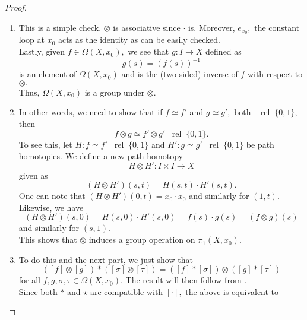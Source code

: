 \documentclass[12pt]{article}
\newcommand{\rel}{\;\;\operatorname{rel}\;}
\begin{document}
\begin{proof} 
	\phantom{Hi}
	\begin{enumerate}
		\item This is a simple check. $\otimes$ is associative since $\cdot$ is. Moreover, $e_{x_0},$ the constant loop at $x_0$ acts as the identity as can be easily checked.\\
		Lastly, given $f\in\Omega(X, x_0),$ we see that $g:I\to X$ defined as
		\begin{equation*} 
			g(s) = (f(s))^{-1}
		\end{equation*}
		is an element of $\Omega(X, x_0)$ and is the (two-sided) inverse of $f$ with respect to $\otimes.$\\
		Thus, $\Omega(X, x_0)$ is a group under $\otimes.$
		\item In other words, we need to show that if $f \simeq f'$ and $g \simeq g',$ both $\rel \{0, 1\},$ then
		\begin{equation*} 
			f\otimes g \simeq f'\otimes g' \rel\{0, 1\}.
		\end{equation*}
		To see this, let $H:f\simeq f' \rel\{0, 1\}$ and $H':g\simeq g'\rel\{0, 1\}$ be path homotopies. We define a new path homotopy 
		\begin{equation*} 
			H\otimes H': I \times I \to X
		\end{equation*} given as
		\begin{equation*} 
			(H \otimes H')(s, t) = H(s, t)\cdot H'(s, t).
		\end{equation*}
		One can note that $(H\otimes H')(0, t) = x_0\cdot x_0$ and similarly for $(1, t).$\\
		Likewise, we have 
		\begin{equation*} 
			(H \otimes H')(s, 0) = H(s, 0)\cdot H'(s, 0) = f(s)\cdot g(s) = (f\otimes g)(s)
		\end{equation*}
		and similarly for $(s, 1).$\\
		This shows that $\otimes$ induces a group operation on $\pi_1(X, x_0).$ 
		\item To do this and the next part, we just show that
		\begin{equation*} 
			([f] \otimes [g]) * ([\sigma] \otimes [\tau]) = ([f] * [\sigma]) \otimes ([g] * [\tau])
		\end{equation*}
		for all $f, g, \sigma, \tau \in \Omega(X, x_0).$ The result will then follow from .\\
		Since both $*$ and $\star$ are compatible with $[\cdot],$ the above is equivalent to

\end{enumerate}
\end{proof}
\end{document}
